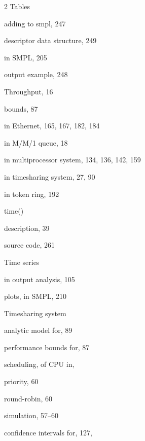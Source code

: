 \begin{multicols}{2}
\noindent Tables\par
\quad adding to smpl, 247\par
\quad descriptor data structure, 249\par
\quad in SMPL, 205\par
\quad output example, 248\par
\noindent Throughput, 16\par
\quad bounds, 87\par
\quad in Ethernet, 165, 167, 182, 184\par
\quad in M/M/1 queue, 18\par
\quad in multiprocessor system, 134, 136, 142, 159\par
\quad in timesharing system, 27, 90\par
\quad in token ring, 192\par
\noindent time()\par
\quad description, 39\par
\quad source code, 261\par
\noindent Time series\par
\quad in output analysis, 105\par
\quad plots, in SMPL, 210\par
\noindent Timesharing system\par
\quad analytic model for, 89\par
\quad performance bounds for, 87\par
\quad scheduling, of CPU in,\par
\qquad priority, 60\par
\qquad round-robin, 60\par
\quad simulation, 57--60\par
\qquad confidence intervals for, 127,\par
\end{multicols}
